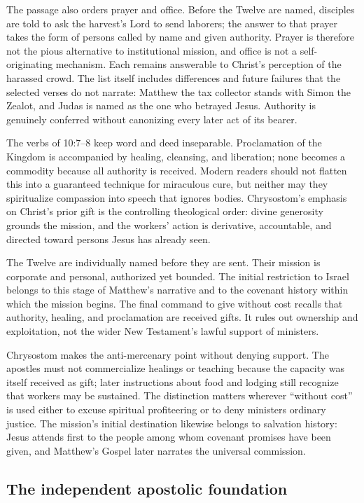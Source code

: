 \begin{deepstudy}
The passage also orders prayer and office. Before the Twelve are named, disciples are told to ask the harvest's Lord to send laborers; the answer to that prayer takes the form of persons called by name and given authority. Prayer is therefore not the pious alternative to institutional mission, and office is not a self-originating mechanism. Each remains answerable to Christ's perception of the harassed crowd. The list itself includes differences and future failures that the selected verses do not narrate: Matthew the tax collector stands with Simon the Zealot, and Judas is named as the one who betrayed Jesus. Authority is genuinely conferred without canonizing every later act of its bearer.

The verbs of 10:7--8 keep word and deed inseparable. Proclamation of the Kingdom is accompanied by healing, cleansing, and liberation; none becomes a commodity because all authority is received. Modern readers should not flatten this into a guaranteed technique for miraculous cure, but neither may they spiritualize compassion into speech that ignores bodies. Chrysostom's emphasis on Christ's prior gift is the controlling theological order: divine generosity grounds the mission, and the workers' action is derivative, accountable, and directed toward persons Jesus has already seen.

The Twelve are individually named before they are sent. Their mission is corporate and personal, authorized yet bounded. The initial restriction to Israel belongs to this stage of Matthew's narrative and to the covenant history within which the mission begins. The final command to give without cost recalls that authority, healing, and proclamation are received gifts. It rules out ownership and exploitation, not the wider New Testament's lawful support of ministers.

Chrysostom makes the anti-mercenary point without denying support. The apostles must not commercialize healings or teaching because the capacity was itself received as gift; later instructions about food and lodging still recognize that workers may be sustained. The distinction matters wherever “without cost” is used either to excuse spiritual profiteering or to deny ministers ordinary justice. The mission's initial destination likewise belongs to salvation history: Jesus attends first to the people among whom covenant promises have been given, and Matthew's Gospel later narrates the universal commission.

\subsection*{The independent apostolic foundation\enspace{}}


\end{deepstudy}
